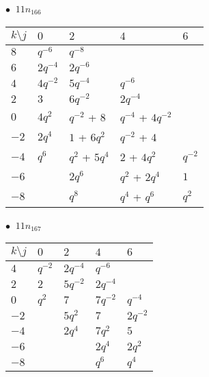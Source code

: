 \begin{minipage}{\linewidth}
$\bullet\ $ $11n_{166}$ \vspace{0.5em} \\
\begin{tabular}{l|llll}
$k \setminus j$ & $0$ & $2$ & $4$ & $6$ \\
\hline
$8$ & $q^{-6}$ & $q^{-8}$ &  &  \\
$6$ & $2q^{-4}$ & $2q^{-6}$ &  &  \\
$4$ & $4q^{-2}$ & $5q^{-4}$ & $q^{-6}$ &  \\
$2$ & $3$ & $6q^{-2}$ & $2q^{-4}$ &  \\
$0$ & $4q^{2}$ & $q^{-2}$ + $8$ & $q^{-4}$ + $4q^{-2}$ &  \\
$-2$ & $2q^{4}$ & $1$ + $6q^{2}$ & $q^{-2}$ + $4$ &  \\
$-4$ & $q^{6}$ & $q^{2}$ + $5q^{4}$ & $2$ + $4q^{2}$ & $q^{-2}$ \\
$-6$ &  & $2q^{6}$ & $q^{2}$ + $2q^{4}$ & $1$ \\
$-8$ &  & $q^{8}$ & $q^{4}$ + $q^{6}$ & $q^{2}$ \\
\end{tabular}
\vspace{2em}
\end{minipage}
%
\begin{minipage}{\linewidth}
$\bullet\ $ $11n_{167}$ \vspace{0.5em} \\
\begin{tabular}{l|llll}
$k \setminus j$ & $0$ & $2$ & $4$ & $6$ \\
\hline
$4$ & $q^{-2}$ & $2q^{-4}$ & $q^{-6}$ &  \\
$2$ & $2$ & $5q^{-2}$ & $2q^{-4}$ &  \\
$0$ & $q^{2}$ & $7$ & $7q^{-2}$ & $q^{-4}$ \\
$-2$ &  & $5q^{2}$ & $7$ & $2q^{-2}$ \\
$-4$ &  & $2q^{4}$ & $7q^{2}$ & $5$ \\
$-6$ &  &  & $2q^{4}$ & $2q^{2}$ \\
$-8$ &  &  & $q^{6}$ & $q^{4}$ \\
\end{tabular}
\vspace{2em}
\end{minipage}
%
